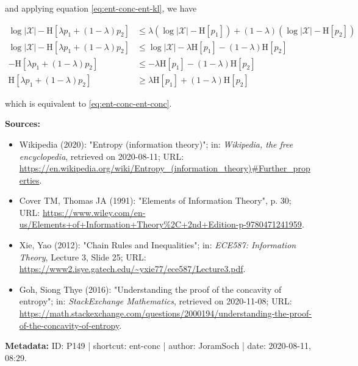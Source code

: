 \documentclass[a4paper,12pt,twoside]{book}
\begin{document}
and applying equation \eqref{eq:ent-conc-ent-kl}, we have

\begin{equation} \label{eq:ent-conc-ent-conc-qed}
\begin{split}
\log |\mathcal{X}| - \mathrm{H}[\lambda p_1 + (1-\lambda) p_2] &\leq \lambda \left( \log |\mathcal{X}| - \mathrm{H}[p_1] \right) + (1-\lambda) \left( \log |\mathcal{X}| - \mathrm{H}[p_2] \right) \\
\log |\mathcal{X}| - \mathrm{H}[\lambda p_1 + (1-\lambda) p_2] &\leq \log |\mathcal{X}| - \lambda \mathrm{H}[p_1] - (1-\lambda) \mathrm{H}[p_2] \\
- \mathrm{H}[\lambda p_1 + (1-\lambda) p_2] &\leq - \lambda \mathrm{H}[p_1] - (1-\lambda) \mathrm{H}[p_2] \\
\mathrm{H}[\lambda p_1 + (1-\lambda) p_2] &\geq \lambda \mathrm{H}[p_1] + (1-\lambda) \mathrm{H}[p_2]
\end{split}
\end{equation}

which is equivalent to \eqref{eq:ent-conc-ent-conc}.


\vspace{1em}
\textbf{Sources:}
\begin{itemize}
\item Wikipedia (2020): "Entropy (information theory)"; in: \textit{Wikipedia, the free encyclopedia}, retrieved on 2020-08-11; URL: \url{https://en.wikipedia.org/wiki/Entropy_(information_theory)#Further_properties}.
\item Cover TM, Thomas JA (1991): "Elements of Information Theory", p. 30; URL: \url{https://www.wiley.com/en-us/Elements+of+Information+Theory%2C+2nd+Edition-p-9780471241959}.
\item Xie, Yao (2012): "Chain Rules and Inequalities"; in: \textit{ECE587: Information Theory}, Lecture 3, Slide 25; URL: \url{https://www2.isye.gatech.edu/~yxie77/ece587/Lecture3.pdf}.
\item Goh, Siong Thye (2016): "Understanding the proof of the concavity of entropy"; in: \textit{StackExchange Mathematics}, retrieved on 2020-11-08; URL: \url{https://math.stackexchange.com/questions/2000194/understanding-the-proof-of-the-concavity-of-entropy}.
\end{itemize}


\vspace{1em}
\textbf{Metadata:} ID: P149 | shortcut: ent-conc | author: JoramSoch | date: 2020-08-11, 08:29.
\vspace{1em}
\end{document}
